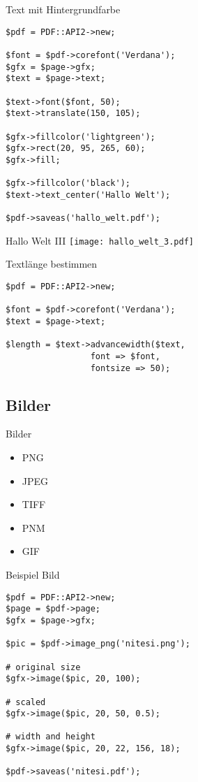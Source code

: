 \begin{frame}[fragile]{Text mit Hintergrundfarbe}
\begin{lstlisting}
$pdf = PDF::API2->new;

$font = $pdf->corefont('Verdana');
$gfx = $page->gfx;
$text = $page->text;

$text->font($font, 50);
$text->translate(150, 105);

$gfx->fillcolor('lightgreen');
$gfx->rect(20, 95, 265, 60);
$gfx->fill;

$gfx->fillcolor('black');
$text->text_center('Hallo Welt');

$pdf->saveas('hallo_welt.pdf');
\end{lstlisting}
\end{frame}

\begin{frame}{Hallo Welt III}
\texttt{[image: hallo\_welt\_3.pdf]}
\end{frame}

\begin{frame}[fragile]{Textlänge bestimmen}
\begin{lstlisting}
$pdf = PDF::API2->new;

$font = $pdf->corefont('Verdana');
$text = $page->text;

$length = $text->advancewidth($text, 
                 font => $font,
                 fontsize => 50);
\end{lstlisting}
\end{frame}

\subsection{Bilder}
\begin{frame}{Bilder}
\begin{itemize}
\item PNG
\item JPEG
\item TIFF
\item PNM
\item GIF
\end{itemize}
\end{frame}

\begin{frame}[fragile]{Beispiel Bild}
\begin{lstlisting}
$pdf = PDF::API2->new;
$page = $pdf->page;
$gfx = $page->gfx;

$pic = $pdf->image_png('nitesi.png');

# original size
$gfx->image($pic, 20, 100);

# scaled
$gfx->image($pic, 20, 50, 0.5);

# width and height
$gfx->image($pic, 20, 22, 156, 18);

$pdf->saveas('nitesi.pdf');
\end{lstlisting}
\end{frame}

